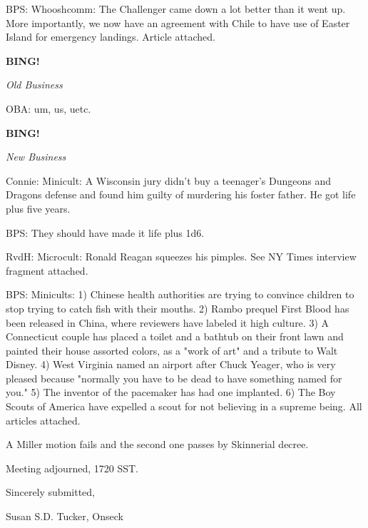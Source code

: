 \documentclass[12pt]{article}
\newcommand{\bing}{{\bf BING!} }
\newcommand{\goto}[1]{\bing \vskip 12pt \centerline{{\em{#1}}}}
\begin{document}
BPS: Whooshcomm: The Challenger came down a lot better than it went up. More importantly, we now have an agreement with Chile to have use of Easter Island for emergency landings. Article attached.

\goto{Old Business}

OBA: um, us, uetc.

\goto{New Business}

Connie: Minicult: A Wisconsin jury didn't buy a teenager's Dungeons and Dragons defense and found him guilty of murdering his foster father. He got life plus five years.

BPS: They should have made it life plus 1d6.

RvdH: Microcult: Ronald Reagan squeezes his pimples. See NY Times interview fragment attached.

BPS: Minicults: 1) Chinese health authorities are trying to convince children to stop trying to catch fish with their mouths. 2) Rambo prequel First Blood has been released in China, where reviewers have labeled it high culture. 3) A Connecticut couple has placed a toilet and a bathtub on their front lawn and painted their house assorted colors, as a "work of art" and a tribute to Walt Disney. 4) West Virginia named an airport after Chuck Yeager, who is very pleased because "normally you have to be dead to have something named for you." 5) The inventor of the pacemaker has had one implanted. 6) The Boy Scouts of America have expelled a scout for not believing in a supreme being. All articles attached.

A Miller motion fails and the second one passes by Skinnerial decree.

\vspace{12pt}

\noindent
Meeting adjourned, 1720 SST.

\vspace{18pt}

\centerline{Sincerely submitted,}
\centerline{Susan S.D. Tucker, Onseck}
\end{document}
